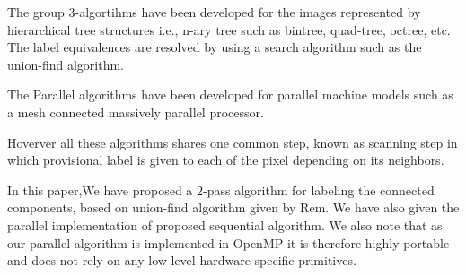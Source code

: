 The group $3$-algortihms have been developed for the images represented by hierarchical tree structures i.e., n-ary tree such 
as bintree, quad-tree, octree, etc. The label equivalences are resolved by using a search algorithm such as the union-find algorithm.

The Parallel algorithms have been developed for parallel machine models such as a mesh connected massively parallel processor.

Hoverver all these algorithms shares one common step, known as scanning step in which provisional label is given to each of the
pixel depending on its neighbors.

In this paper,We have proposed a $2$-pass algorithm for labeling the connected components, based on union-find algorithm given by Rem.
We have also given the parallel implementation of proposed sequential algorithm. We also note that as our parallel algorithm is 
implemented in OpenMP it is therefore highly portable and does not rely on any low level hardware specific primitives.
